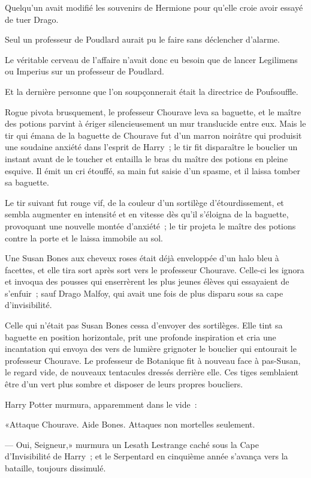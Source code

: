 Quelqu'un avait modifié les souvenirs de Hermione pour qu'elle croie avoir essayé de tuer Drago.

Seul un professeur de Poudlard aurait pu le faire sans déclencher d'alarme.

Le véritable cerveau de l'affaire n'avait donc eu besoin que de lancer Legilimens ou Imperius sur un professeur de Poudlard.

Et la dernière personne que l'on soupçonnerait était la directrice de Poufsouffle.

Rogue pivota brusquement, le professeur Chourave leva sa baguette, et le maître des potions parvint à ériger silencieusement un mur translucide entre eux. Mais le tir qui émana de la baguette de Chourave fut d'un marron noirâtre qui produisit une soudaine anxiété dans l'esprit de Harry~; le tir fit disparaître le bouclier un instant avant de le toucher et entailla le bras du maître des potions en pleine esquive. Il émit un cri étouffé, sa main fut saisie d'un spasme, et il laissa tomber sa baguette.

Le tir suivant fut rouge vif, de la couleur d'un sortilège d'étourdissement, et sembla augmenter en intensité et en vitesse dès qu'il s'éloigna de la baguette, provoquant une nouvelle montée d'anxiété~; le tir projeta le maître des potions contre la porte et le laissa immobile au sol.

Une Susan Bones aux cheveux roses était déjà enveloppée d'un halo bleu à facettes, et elle tira sort après sort vers le professeur Chourave. Celle-ci les ignora et invoqua des pousses qui enserrèrent les plus jeunes élèves qui essayaient de s'enfuir~; sauf Drago Malfoy, qui avait une fois de plus disparu sous sa cape d'invisibilité.

Celle qui n'était pas Susan Bones cessa d'envoyer des sortilèges. Elle tint sa baguette en position horizontale, prit une profonde inspiration et cria une incantation qui envoya des vers de lumière grignoter le bouclier qui entourait le professeur Chourave. Le professeur de Botanique fit à nouveau face à pas-Susan, le regard vide, de nouveaux tentacules dressés derrière elle. Ces tiges semblaient être d'un vert plus sombre et disposer de leurs propres boucliers.

Harry Potter murmura, apparemment dans le vide~:

«Attaque Chourave. Aide Bones. Attaques non mortelles seulement.

--- Oui, Seigneur,» murmura un Lesath Lestrange caché sous la Cape d'Invisibilité de Harry~; et le Serpentard en cinquième année s'avança vers la bataille, toujours dissimulé.

